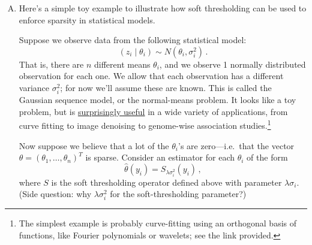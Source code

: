 \documentclass{mynotes}
\begin{document}
\begin{enumerate}[(A)]
\item Here's a simple toy example to illustrate how soft thresholding can be used to enforce sparsity in statistical models.

Suppose we observe data from the following statistical model:
$$
(z_{i} \mid \theta_i) \sim N(\theta_i, \sigma^2_i) \, .
$$
That is, there are $n$ different means $\theta_i$, and we observe 1 normally distributed observation for each one.  We allow that each observation has a different variance $\sigma^2_i$; for now we'll assume these are known.  This is called the Gaussian sequence model, or the normal-means problem.  It looks like a toy problem, but is \href{http://statweb.stanford.edu/~imj/GE06-11-13.pdf}{surprisingly useful} in a wide variety of applications, from curve fitting to image denoising to genome-wise association studies.\footnote{The simplest example is probably curve-fitting using an orthogonal basis of functions, like Fourier polynomials or wavelets; see the link provided.}

Now suppose we believe that a lot of the $\theta_i$'s are zero---i.e.~that the vector $\theta = (\theta_1, \ldots, \theta_n)^T$ is sparse.  Consider an estimator for each $\theta_i$ of the form
$$
\widehat{\theta}(y_i) = S_{\lambda \sigma_i^2}(y_i) \, ,
$$
where $S$ is the soft thresholding operator defined above with parameter $\lambda \sigma_i$.  (Side question: why $\lambda \sigma_i^2$ for the soft-thresholding parameter?)


\end{enumerate}
\end{document}
